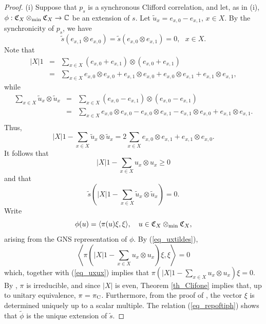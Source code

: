 \documentclass[11pt]{amsart}
\theoremstyle{definition}
\newcommand{\cl}[1]{\mathcal{#1}}
\newcommand{\bb}[1]{\mathbb{#1}}
\begin{document}
\begin{proof}
(i) Suppose that $p_s$ is a synchronous Clifford correlation, and let, as in (i), 
$\phi : \frak{C}_X\otimes_{\min} \frak{C}_X \to \bb{C}$ be an extension of $s$.
Let $\tilde{u}_x = e_{x,0} - e_{x,1}$, $x\in X$. 
By the synchronicity of $p_s$, we have 
$$\tilde{s}(e_{x,1}\otimes e_{x,0}) = \tilde{s}(e_{x,0}\otimes e_{x,1}) = 0, \ \ \ x\in X.$$
Note that 
\begin{eqnarray*}
|X|1 
& = & 
\sum_{x\in X} (e_{x,0} + e_{x,1})\otimes (e_{x,0} + e_{x,1})\\
& = & 
\sum_{x\in X} e_{x,0} \otimes e_{x,0} + e_{x,1} \otimes e_{x,0} + 
e_{x,0} \otimes e_{x,1} + e_{x,1} \otimes e_{x,1},
\end{eqnarray*}
while
\begin{eqnarray*}
\sum_{x\in X} \tilde{u}_x\otimes \tilde{u}_x 
& = & 
\sum_{x\in X} (e_{x,0} - e_{x,1})\otimes (e_{x,0} - e_{x,1})\\
& = & 
\sum_{x\in X}  e_{x,0} \otimes e_{x,0} - e_{x,0} \otimes e_{x,1} 
- e_{x,1} \otimes e_{x,0} + e_{x,1} \otimes e_{x,1}.\\
\end{eqnarray*}
Thus, 
$$|X|1 - \sum_{x\in X} \tilde{u}_x\otimes \tilde{u}_x = 
2\sum_{x\in X} e_{x,0} \otimes e_{x,1} 
+ e_{x,1} \otimes e_{x,0}.$$
It follows that
\begin{equation}\label{eq_uxux}
|X|1 - \sum_{x\in X} u_x\otimes u_x \geq 0 
\end{equation}
and that 
\begin{equation}\label{eq_uxtildes}
\tilde{s}(|X|1 - \sum_{x\in X} \tilde{u}_x\otimes \tilde{u}_x) = 0.
\end{equation}
Write 
\begin{equation}\label{eq_repoftiph}
\phi(u) = \langle \pi(u)\xi,\xi\rangle, \ \ \ 
u\in \frak{C}_X \otimes_{\min} \frak{C}_X,
\end{equation}
arising from the GNS representation of $\phi$. 
By (\ref{eq_uxtildes}), 
$$\left\langle \pi\left(|X|1 - \sum_{x\in X} u_x\otimes u_x\right)\xi,\xi\right\rangle = 0$$
which, together with (\ref{eq_uxux}) implies that 
$\pi\left(|X|1 - \sum_{x\in X} u_x\otimes u_x\right)\xi = 0$. 
By \cite[Lemma 1.3]{tsirelson}, 
$\pi$ is irreducible, and since $|X|$ is even, 
Theorem \ref{th_Clifone} implies that, up to unitary equivalence, 
$\pi = \pi_{\rm C}$. 
Furthermore, from the proof of \cite[Lemma 1.3]{tsirelson}, 
the vector $\xi$ is determined uniquely up to a scalar multiple. 
The relation (\ref{eq_repoftiph}) shows that 
$\tilde{\phi}$ is 
the unique extension of $\tilde{s}$.



\end{proof}
\end{document}

